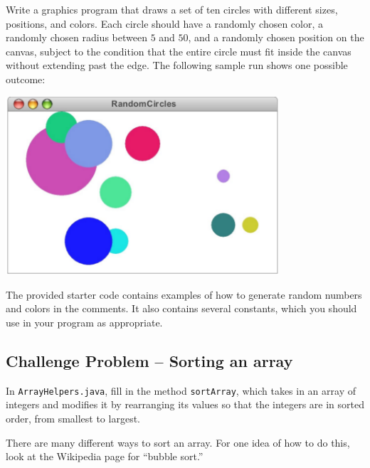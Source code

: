 \documentclass[11pt]{article}
\theoremstyle{plain}
\theoremstyle{definition}
\theoremstyle{remark}
\begin{document}
Write a graphics program that draws a set of ten circles with different sizes,
positions, and colors. Each circle should have a randomly chosen color, a
randomly chosen radius between $5$ and $50$, and a randomly chosen position on
the canvas, subject to the condition that the entire circle must fit inside the
canvas without extending past the edge. The following sample run shows one
possible outcome:
\begin{center}
  \includegraphics[width=4in]{random_circles.png}
\end{center}
The provided starter code contains examples of how to generate random numbers
and colors in the comments. It also contains several constants, which you should
use in your program as appropriate.
\subsection*{Challenge Problem -- Sorting an array}
In {\tt ArrayHelpers.java}, fill in the method {\tt sortArray}, which takes in
an array of integers and modifies it by rearranging its values so that the
integers are in sorted order, from smallest to largest.

There are many different ways to sort an array. For one idea of how to do this,
look at the Wikipedia page for ``bubble sort.''
\end{document}
